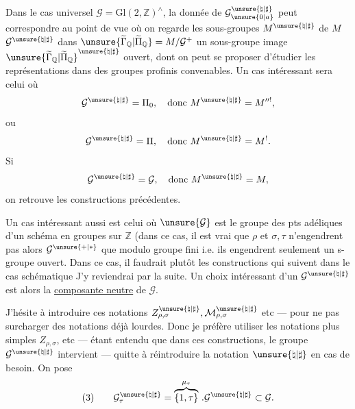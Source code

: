 Dans le cas universel $\mathcal{G}=\mathrm{Gl}(2,\mathbb{Z})^{\wedge}$,
la donnée de $\mathcal{G}_{\unsure{0|a}}^{\unsure{\natural|\sharp}}$
peut correspondre au point de vue où on regarde les sous-groupes
$M^{\unsure{\natural|\sharp}}$ de $M$
$\mathcal{G}^{\unsure{\natural|\sharp}}$
dans $\unsure{\widetilde{\Gamma}_{\mathbb{Q}}|\widetilde{\Pi}_{\mathbb{Q}}}=M/\mathcal{G}^{+}$
un sous-groupe image
$\unsure{\widetilde{\Gamma}_{\mathbb{Q}}|\widetilde{\Pi}_{\mathbb{Q}}}^{\unsure{\natural|\sharp}}$
ouvert, dont on peut se proposer d'étudier les représentations dans des groupes
profinis convenables. Un cas intéressant sera celui où
\[
\mathcal{G}^{\unsure{\natural|\sharp}}=\Pi_{0},\quad
\text{donc }M^{\unsure{\natural|\sharp}}=M^{\prime\prime!},
\]
ou
\[
\mathcal{G}^{\unsure{\natural|\sharp}}=\Pi,\quad
\text{donc }M^{\unsure{\natural|\sharp}}=M^{!}.
\]
Si
\[
\mathcal{G}^{\unsure{\natural|\sharp}}=\mathcal{G},\quad
\text{donc }M^{\unsure{\natural|\sharp}}=M,
\]
on retrouve les constructions précédentes.



Un cas intéressant aussi est celui où $\unsure{\mathcal{G}}$ est le groupe
des pts adéliques  d'un schéma en groupes sur $\mathbb{Z}$
(dans ce cas, il est vrai que $\rho$ et $\sigma,\tau$ n'engendrent
pas alors $\mathcal{G}^{\unsure{+|*}}$ que modulo groupe fini
i.e. ils engendrent  seulement un s-groupe ouvert.
Dans ce cas, il faudrait plutôt \uline{} les constructions
qui suivent dans le cas schématique
J'y reviendrai par la suite. Un choix intéressant d'un
$\mathcal{G}^{\unsure{\natural|\sharp}}$ est alors la
\uline{composante neutre} de $\mathcal{G}$.

J'hésite à introduire ces notations
$Z_{\rho,\sigma}^{\unsure{\natural|\sharp}},\mathcal{M}_{\rho,\sigma}^{\unsure{\natural|\sharp}}$
etc --- pour ne pas surcharger des notations déjà lourdes. Donc je préfère
utiliser les notations plus simples $Z_{\rho,\sigma}$, etc --- étant entendu
que dans ces constructions, le groupe $\mathcal{G}^{\unsure{\natural|\sharp}}$
intervient --- quitte à réintroduire la notation $\unsure{\natural|\sharp}$
en cas de besoin.
On pose
\[
(3)\qquad
\mathcal{G}_{\tau}^{\unsure{\natural|\sharp}}
=\overbrace{\{1,\tau\}}^{\mu_{\tau}}\,.
\mathcal{G}^{\unsure{\natural|\sharp}}\subset\mathcal{G}.
\]

